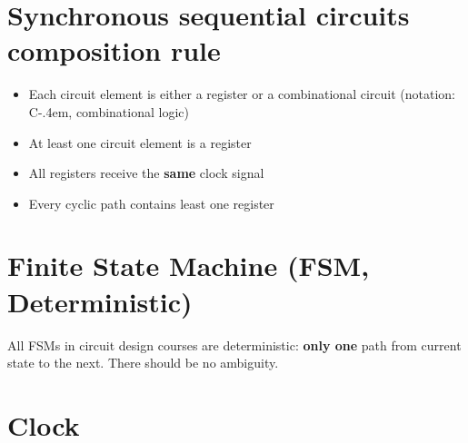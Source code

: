\documentclass[8pt,a4paper,landscape]{extarticle}
\begin{document}
\begin{multicols*}{3}
\section*{Synchronous sequential circuits composition rule}
\begin{itemize}
\item Each circuit element is either a register or a combinational circuit (notation: C\kern-.4em\raisebox{-.3em}{L}, combinational logic)
\item At least one circuit element is a register
\item All registers receive the \textbf{same} clock signal
\item Every cyclic path contains least one register
\end{itemize}

\section*{Finite State Machine (FSM, Deterministic)}
All FSMs in circuit design courses are deterministic: \textbf{only one} path from current state to the next.
There should be no ambiguity.

\section*{Clock}


\end{multicols*}
\end{document}
